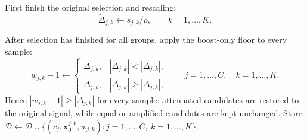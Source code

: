 \begin{algorithm}[H]
\begin{algorithmic}[1]
                \State First finish the original selection and rescaling:
                \[
                    \widetilde{\Delta}_{j,k}\leftarrow s_{j,k}/\rho,
                    \qquad k=1,\dots,K.
                \]
            \EndFor

            \State After selection has finished for all groups, apply the
            boost-only floor to every sample:
            \[
                w_{j,k}-1\leftarrow
                \begin{cases}
                    \Delta_{j,k},
                    &|\widetilde{\Delta}_{j,k}|<|\Delta_{j,k}|,\\
                    \widetilde{\Delta}_{j,k},
                    &|\widetilde{\Delta}_{j,k}|\ge|\Delta_{j,k}|,
                \end{cases}
                \qquad j=1,\dots,C,\quad k=1,\dots,K.
            \]
            \State Hence $|w_{j,k}-1|\ge|\Delta_{j,k}|$ for every sample:
            attenuated candidates are restored to the original signal, while
            equal or amplified candidates are kept unchanged.
            \State Store
            $\mathcal{D}\leftarrow\mathcal{D}\cup
            \{(c_j,\mathbf{x}_0^{j,k},w_{j,k}):
            j=1,\dots,C,\ k=1,\dots,K\}$.


\end{algorithmic}
\end{algorithm}
